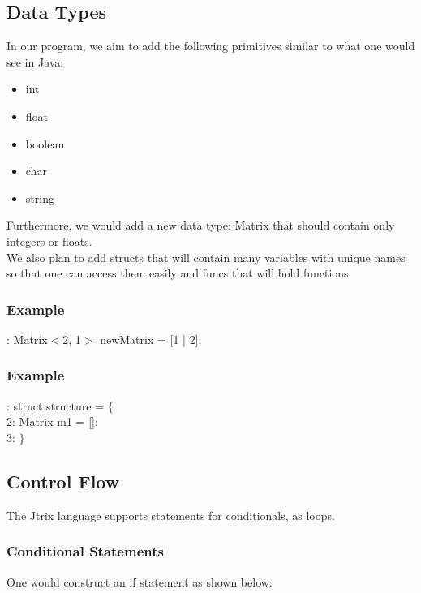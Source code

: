 \documentclass[12pt]{article}
\begin{document}
\subsection{Data Types}
In our program, we aim to add the following primitives similar to what one would see in Java:
\begin{itemize}
\item int
\item float
\item boolean
\item char
\item string
\end{itemize}
Furthermore, we would add a new data type: Matrix that should contain only integers or floats.\\
We also plan to add structs that will contain many variables with unique names so that one can access them easily and funcs that will hold functions.
\subsubsection{Example}
{: Matrix$<$2, 1$>$ newMatrix = [1 | 2];
}
\subsubsection{Example}
{: struct structure = $\{$\\
2: \hspace*{1cm} Matrix m1 = [];\\
3: $\}$
}

\subsection{Control Flow}
The Jtrix language supports {\selectfont { if, else if, else }} statements for conditionals, {\selectfont { for, foreach, while }} as loops.

\subsubsection{Conditional Statements}
One would construct an if statement as shown below:\\
{}
\end{document}
